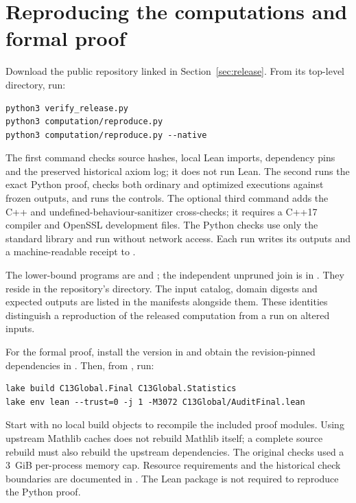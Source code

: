 \documentclass[11pt]{article}
\theoremstyle{definition}
\theoremstyle{remark}
\begin{document}
\section{Reproducing the computations and formal proof}\label{app:reproduce}
Download the public repository linked in Section~\ref{sec:release}.
From its top-level directory, run:
\begin{verbatim}
python3 verify_release.py
python3 computation/reproduce.py
python3 computation/reproduce.py --native
\end{verbatim}
The first command checks source hashes, local Lean imports, dependency
pins and the preserved historical axiom log; it does not run Lean.
The second runs the exact Python proof, checks both ordinary and
optimized executions against frozen outputs, and runs the controls.
The optional third command adds the C++ and undefined-behaviour-sanitizer
cross-checks; it requires a C++17 compiler and OpenSSL development files.
The Python checks use only the standard library and run without network
access. Each run writes its outputs and a machine-readable receipt to
.

The lower-bound programs are  and
; the independent unpruned join is in
. They reside in the repository's
directory. The input catalog, domain digests and expected outputs are
listed in the manifests alongside them. These identities distinguish a
reproduction of the released computation from a run on altered inputs.

For the formal proof, install the version in 
and obtain the revision-pinned dependencies in .
Then, from , run:
\begin{verbatim}
lake build C13Global.Final C13Global.Statistics
lake env lean --trust=0 -j 1 -M3072 C13Global/AuditFinal.lean
\end{verbatim}
Start with no local build objects to recompile the included proof modules.
Using upstream Mathlib caches does not rebuild Mathlib itself; a complete
source rebuild must also rebuild the upstream dependencies. The original
checks used a 3~GiB per-process memory cap. Resource requirements and the
historical check boundaries are documented in .
The Lean package is not required to reproduce the Python proof.
\end{document}
